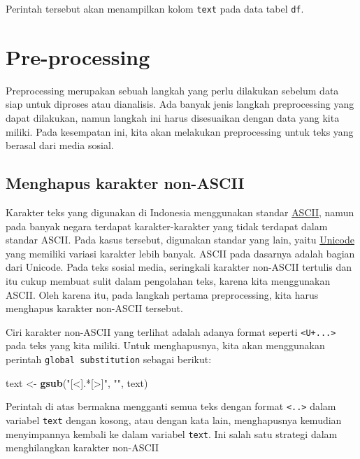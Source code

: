\documentclass[]{book}
\newenvironment{Shaded}{\begin{snugshade}}{\end{snugshade}}
\newcommand{\KeywordTok}[1]{\textcolor[rgb]{0.13,0.29,0.53}{\textbf{#1}}}
\newcommand{\NormalTok}[1]{#1}
\newcommand{\StringTok}[1]{\textcolor[rgb]{0.31,0.60,0.02}{#1}}
\begin{document}
Perintah tersebut akan menampilkan kolom \texttt{text} pada data tabel
\texttt{df}.

\hypertarget{pre-processing}{%
\section{Pre-processing}\label{pre-processing}}

Preprocessing merupakan sebuah langkah yang perlu dilakukan sebelum data
siap untuk diproses atau dianalisis. Ada banyak jenis langkah
preprocessing yang dapat dilakukan, namun langkah ini harus disesuaikan
dengan data yang kita miliki. Pada kesempatan ini, kita akan melakukan
preprocessing untuk teks yang berasal dari media sosial.

\hypertarget{menghapus-karakter-non-ascii}{%
\subsection{Menghapus karakter
non-ASCII}\label{menghapus-karakter-non-ascii}}

Karakter teks yang digunakan di Indonesia menggunakan standar
\href{https://en.wikipedia.org/wiki/ASCII}{ASCII}, namun pada banyak
negara terdapat karakter-karakter yang tidak terdapat dalam standar
ASCII. Pada kasus tersebut, digunakan standar yang lain, yaitu
\href{https://en.wikipedia.org/wiki/Unicode}{Unicode} yang memiliki
variasi karakter lebih banyak. ASCII pada dasarnya adalah bagian dari
Unicode. Pada teks sosial media, seringkali karakter non-ASCII tertulis
dan itu cukup membuat sulit dalam pengolahan teks, karena kita
menggunakan ASCII. Oleh karena itu, pada langkah pertama preprocessing,
kita harus menghapus karakter non-ASCII tersebut.

Ciri karakter non-ASCII yang terlihat adalah adanya format seperti
\texttt{\textless{}U+...\textgreater{}} pada teks yang kita miliki.
Untuk menghapusnya, kita akan menggunakan perintah
\texttt{global\ substitution} sebagai berikut:

\begin{Shaded}
\begin{Highlighting}[]
\NormalTok{text <-}\StringTok{ }\KeywordTok{gsub}\NormalTok{(}\StringTok{"[<].*[>]"}\NormalTok{, }\StringTok{""}\NormalTok{, text)}
\end{Highlighting}
\end{Shaded}

Perintah di atas bermakna mengganti semua teks dengan format
\texttt{\textless{}..\textgreater{}} dalam variabel \texttt{text} dengan
kosong, atau dengan kata lain, menghapusnya kemudian menyimpannya
kembali ke dalam variabel \texttt{text}. Ini salah satu strategi dalam
menghilangkan karakter non-ASCII
\end{document}
